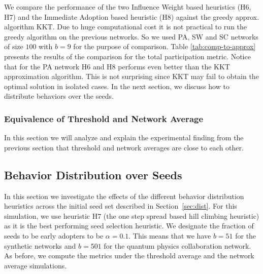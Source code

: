 \documentclass[letterpaper]{article}
\theoremstyle{plain} 		\newtheorem{thm}{Theorem}[section]
\theoremstyle{definition} 	\newtheorem{defn}[thm]{Definition}
\theoremstyle{remark}		\newtheorem{rem}{Remark}
\begin{document}
We compare the performance of the two Influence Weight  based heuristics (H6, H7) and the Immediate Adoption based heuristic (H8) against the greedy approx. algorithm KKT. Due to huge computational cost it is not practical to run the greedy algorithm on the previous networks. So we used PA, SW and SC networks of size $100$ with $b=9$ for the purpose of comparison. Table \ref{tab:comp-to-approx} presents the results of the comparison for the total participation metric. Notice that for the PA network H6 and H8 performs even better than the KKT approximation algorithm. This is not surprising since KKT may fail to obtain the optimal solution in isolated cases. In the next section, we discuss how to distribute behaviors over the seeds.

%         

\subsubsection{Equivalence of Threshold and Network Average}
In this section we will analyze and explain the experimental finding from the previous section that threshold and network averages are close to each other.

\subsection{Behavior Distribution over Seeds}

In this section we investigate the effects of the different behavior distribution heuristics across the initial seed set described in Section~\ref{sec:dist}. For this simulation, we use heuristic H7 (the one step spread based hill climbing heuristic) as it is the best performing seed selection heuristic. We designate the fraction of seeds to be early adopters to be $\alpha=0.1$. This means that we have $b=51$ for the synthetic networks and $b=501$ for the quantum physics collaboration network. As before, we compute the metrics under the threshold average and the network average simulations.
\end{document}
